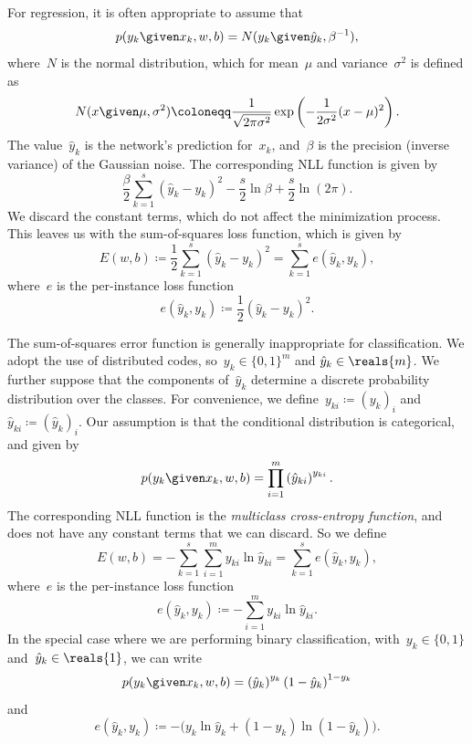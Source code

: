 \documentclass[11pt,a4paper]{article}
\numberwithin{equation}{section}
\begin{document}
For regression, it is often appropriate to assume that
\[
	p(y_k \given x_k, w, b) = N(y_k \given \hat{y}_k, \beta^{-1}),
\]
where~$N$ is the normal distribution, which for mean~$\mu$ and
variance~$\sigma^2$ is defined as
\[
	N(x \given \mu, \sigma^2) \coloneqq \frac{1}{\sqrt{2 \pi \sigma^2}}
		\exp\left( -\frac{1}{2 \sigma^2} (x - \mu)^2 \right).
\]
The value~$\hat{y}_k$ is the network's prediction for~$x_k$, and~$\beta$ is the
precision (inverse variance) of the Gaussian noise. The corresponding NLL
function is given by
\[
	\frac{\beta}{2} \sum_{k = 1}^s \left(\hat{y}_k - y_k\right)^2 -
		\frac{s}{2} \ln\beta + \frac{s}{2} \ln(2 \pi).
\]
We discard the constant terms, which do not affect the minimization process.
This leaves us with the sum-of-squares loss function, which is given by
\begin{equation}
	E(w, b)
	\coloneqq \frac{1}{2} \sum_{k = 1}^s \left(\hat{y}_k - y_k\right)^2
	= \sum_{k = 1}^s e(\hat{y}_k, y_k),
	\label{eq:sum_of_squares}
\end{equation}
where~$e$ is the per-instance loss function
\[
	e(\hat{y}_k, y_k) \coloneqq \frac{1}{2} \left(\hat{y}_k - y_k\right)^2.
\]

The sum-of-squares error function is generally inappropriate for classification.
We adopt the use of distributed codes, so~$y_k \in \{0, 1\}^m$ and $\hat{y}_k
\in \reals{m}$. We further suppose that the components of~$\hat{y}_k$ determine
a discrete probability distribution over the classes. For convenience, we
define~$y_{ki} \coloneqq (y_k)_i$ and~$\hat{y}_{ki} \coloneqq (\hat{y}_k)_i$.
Our assumption is that the conditional distribution is categorical, and given by
\[
	p(y_k \given x_k, w, b) = \prod_{i = 1}^m \left(\hat{y}_{ki}\right)^{y_{ki}}.
\]
The corresponding NLL function is the \emph{multiclass cross-entropy function},
and does not have any constant terms that we can discard. So we define
\[
	E(w, b)
	= -\sum_{k = 1}^s \sum_{i = 1}^m y_{ki} \ln\hat{y}_{ki}
	= \sum_{k = 1}^s e(\hat{y}_k, y_k),
\]
where~$e$ is the per-instance loss function
\[
	e(\hat{y}_k, y_k) \coloneqq -\sum_{i = 1}^m y_{ki} \ln\hat{y}_{ki}.
\]
In the special case where we are performing binary classification, with~$y_k \in
\{0, 1\}$ and~$\hat{y}_k \in \reals{1}$, we can write
\[
	p(y_k \given x_k, w, b) = \left(\hat{y}_k\right)^{y_k}
		\left(1 - \hat{y}_k\right)^{1 - y_k}
\]
and
\[
	e(\hat{y}_k, y_k) \coloneqq -\big(
		y_k \ln\hat{y}_k + (1 - y_k) \ln(1 - \hat{y}_k) \big).
\]
\end{document}
